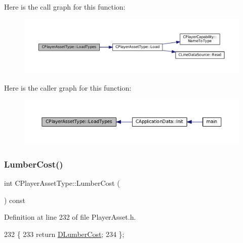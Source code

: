Here is the call graph for this function\+:\nopagebreak
\begin{figure}[H]
\begin{center}
\leavevmode
\includegraphics[width=350pt]{classCPlayerAssetType_ad36348338ae4fea7e70450ef30c92a26_cgraph}
\end{center}
\end{figure}
Here is the caller graph for this function\+:\nopagebreak
\begin{figure}[H]
\begin{center}
\leavevmode
\includegraphics[width=350pt]{classCPlayerAssetType_ad36348338ae4fea7e70450ef30c92a26_icgraph}
\end{center}
\end{figure}
\hypertarget{classCPlayerAssetType_a0263936149918ed7fe3844bcd0e15d72}{}\label{classCPlayerAssetType_a0263936149918ed7fe3844bcd0e15d72} 
\subsubsection{\texorpdfstring{Lumber\+Cost()}{LumberCost()}}
{\footnotesize\ttfamily int C\+Player\+Asset\+Type\+::\+Lumber\+Cost (\begin{DoxyParamCaption}{ }\end{DoxyParamCaption}) const\hspace{0.3cm}{\ttfamily [inline]}}



Definition at line 232 of file Player\+Asset.\+h.


\begin{DoxyCode}
232                               \{
233             \textcolor{keywordflow}{return} \hyperlink{classCPlayerAssetType_aab2aeb930d654fd5eab51be157b3439f}{DLumberCost};  
234         \};
\end{DoxyCode}
\hypertarget{classCPlayerAssetType_a1c1648ef0fdd2d112508c2ef9b7b70d1}{}\label{classCPlayerAssetType_a1c1648ef0fdd2d112508c2ef9b7b70d1} 
